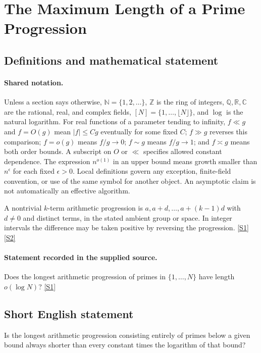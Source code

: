 \documentclass[11pt,a4paper]{article}
\newcommand{\N}{\mathbb{N}}
\newcommand{\Z}{\mathbb{Z}}
\newcommand{\Q}{\mathbb{Q}}
\newcommand{\R}{\mathbb{R}}
\newcommand{\C}{\mathbb{C}}
\newcommand{\sref}[2]{\hyperlink{source:#1:#2}{[S#2]}}
\begin{document}
\section{The Maximum Length of a Prime Progression}\label{statement}


\subsection{Definitions and mathematical statement}

\paragraph{Shared notation.}Unless a section says otherwise, $\N=\{1,2,\ldots\}$,
$\Z$ is the ring of integers, $\Q,\R,\C$ are the rational, real, and complex
fields, $[N]=\{1,\ldots,\lfloor N\rfloor\}$, and $\log$ is the natural
logarithm. For real functions of a parameter tending to infinity,
$f\ll g$ and $f=O(g)$ mean $|f|\leq Cg$ eventually for some fixed $C$;
$f\gg g$ reverses this comparison; $f=o(g)$ means $f/g\to0$;
$f\sim g$ means $f/g\to1$; and $f\asymp g$ means both order bounds.
A subscript on $O$ or $\ll$ specifies allowed constant dependence.
The expression $n^{o(1)}$ in an upper bound means growth smaller than
$n^\epsilon$ for each fixed $\epsilon>0$. Local definitions govern any
exception, finite-field convention, or use of the same symbol for another
object. An asymptotic claim is not automatically an effective algorithm.



A nontrivial $k$-term arithmetic progression is $a,a+d,\ldots,a+(k-1)d$ with $d\ne0$ and distinct terms, in the stated ambient group or space. In integer intervals the difference may be taken positive by reversing the progression. \sref{statement}{1} \sref{statement}{2}

\paragraph{Statement recorded in the supplied source.}
Does the longest arithmetic progression of primes in $\{1,\ldots,N\}$ have length $o(\log N)$? \sref{statement}{1}

\subsection{Short English statement}

Is the longest arithmetic progression consisting entirely of primes below a given bound always shorter than every constant times the logarithm of that bound?
\end{document}
